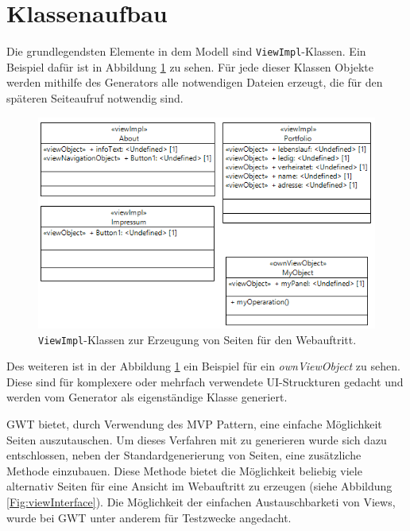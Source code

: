 \newpage
\section{Klassenaufbau}
Die grundlegendsten Elemente in dem Modell sind \texttt{ViewImpl}-Klassen. Ein
Beispiel dafür ist in Abbildung \ref{Fig:viewimpl} zu sehen. Für jede dieser
Klassen Objekte werden mithilfe des Generators alle notwendigen Dateien
erzeugt, die für den späteren Seiteaufruf notwendig sind.

\begin{figure}[htbp]
\begin{center}
\includegraphics[width=1.0\textwidth]{./img/GWT-Model-Views-alg.png}
\caption{\texttt{ViewImpl}-Klassen zur Erzeugung von Seiten
für den Webauftritt.}\label{Fig:viewimpl}
\end{center}
\end{figure}

Des weiteren ist in der Abbildung \ref{Fig:viewimpl} ein Beispiel für ein
\textit{ownViewObject} zu sehen. Diese sind für komplexere oder mehrfach
verwendete UI-Struckturen gedacht und werden vom Generator als eigenständige
Klasse generiert.

GWT bietet, durch Verwendung des MVP Pattern, eine einfache Möglichkeit Seiten
auszutauschen. Um dieses Verfahren mit zu generieren wurde sich dazu
entschlossen, neben der Standardgenerierung von Seiten, eine zusätzliche
Methode einzubauen. Diese Methode bietet die Möglichkeit beliebig viele
alternativ Seiten für eine Ansicht im Webauftritt zu erzeugen (siehe Abbildung
\ref{Fig:viewInterface}). Die Möglichkeit der einfachen Austauschbarketi von
Views, wurde bei GWT unter anderem für Testzwecke angedacht.

